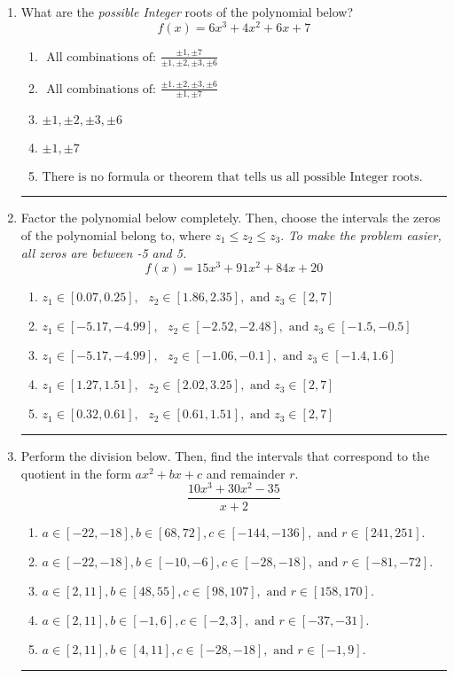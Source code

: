 \documentclass[14pt]{extbook}
\newcommand{\litem}[1]{\item#1\hspace*{-1cm}\rule{\textwidth}{0.4pt}}
\begin{document}
\begin{enumerate}
\litem{
What are the \textit{possible Integer} roots of the polynomial below?\[ f(x) = 6x^{3} +4 x^{2} +6 x + 7 \]\begin{enumerate}[label=\Alph*.]
\item \( \text{ All combinations of: }\frac{\pm 1,\pm 7}{\pm 1,\pm 2,\pm 3,\pm 6} \)
\item \( \text{ All combinations of: }\frac{\pm 1,\pm 2,\pm 3,\pm 6}{\pm 1,\pm 7} \)
\item \( \pm 1,\pm 2,\pm 3,\pm 6 \)
\item \( \pm 1,\pm 7 \)
\item \( \text{There is no formula or theorem that tells us all possible Integer roots.} \)

\end{enumerate} }
\litem{
Factor the polynomial below completely. Then, choose the intervals the zeros of the polynomial belong to, where $z_1 \leq z_2 \leq z_3$. \textit{To make the problem easier, all zeros are between -5 and 5.}\[ f(x) = 15x^{3} +91 x^{2} +84 x + 20 \]\begin{enumerate}[label=\Alph*.]
\item \( z_1 \in [0.07, 0.25], \text{   }  z_2 \in [1.86, 2.35], \text{   and   } z_3 \in [2, 7] \)
\item \( z_1 \in [-5.17, -4.99], \text{   }  z_2 \in [-2.52, -2.48], \text{   and   } z_3 \in [-1.5, -0.5] \)
\item \( z_1 \in [-5.17, -4.99], \text{   }  z_2 \in [-1.06, -0.1], \text{   and   } z_3 \in [-1.4, 1.6] \)
\item \( z_1 \in [1.27, 1.51], \text{   }  z_2 \in [2.02, 3.25], \text{   and   } z_3 \in [2, 7] \)
\item \( z_1 \in [0.32, 0.61], \text{   }  z_2 \in [0.61, 1.51], \text{   and   } z_3 \in [2, 7] \)

\end{enumerate} }
\litem{
Perform the division below. Then, find the intervals that correspond to the quotient in the form $ax^2+bx+c$ and remainder $r$.\[ \frac{10x^{3} +30 x^{2} -35}{x + 2} \]\begin{enumerate}[label=\Alph*.]
\item \( a \in [-22, -18], b \in [68, 72], c \in [-144, -136], \text{ and } r \in [241, 251]. \)
\item \( a \in [-22, -18], b \in [-10, -6], c \in [-28, -18], \text{ and } r \in [-81, -72]. \)
\item \( a \in [2, 11], b \in [48, 55], c \in [98, 107], \text{ and } r \in [158, 170]. \)
\item \( a \in [2, 11], b \in [-1, 6], c \in [-2, 3], \text{ and } r \in [-37, -31]. \)
\item \( a \in [2, 11], b \in [4, 11], c \in [-28, -18], \text{ and } r \in [-1, 9]. \)


\end{enumerate}}
\end{enumerate}
\end{document}
